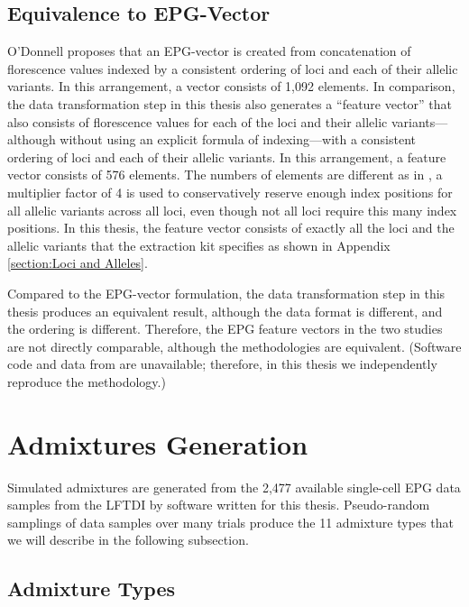 \subsection{Equivalence to EPG-Vector}

O'Donnell \cite{odonnell_clustering_2021} proposes that an EPG-vector is created from concatenation of florescence values indexed by a consistent ordering of loci and each of their allelic variants. In this arrangement, a vector consists of 1,092 elements. In comparison, the data transformation step in this thesis also generates a ``feature vector'' that also consists of florescence values for each of the loci and their allelic variants---although without using an explicit formula of indexing---with a consistent ordering of loci and each of their allelic variants. In this arrangement, a feature vector consists of 576 elements. The numbers of elements are different as in \cite{odonnell_clustering_2021}, a multiplier factor of 4 is used to conservatively reserve enough index positions for all allelic variants across all loci, even though not all loci require this many index positions. In this thesis, the feature vector consists of exactly all the loci and the allelic variants that the extraction kit specifies as shown in Appendix \ref{section:Loci and Alleles}.

Compared to the EPG-vector formulation, the data transformation step in this thesis produces an equivalent result, although the data format is different, and the ordering is different. Therefore, the EPG feature vectors in the two studies are not directly comparable, although the methodologies are equivalent. (Software code and data from \cite{odonnell_clustering_2021} are unavailable; therefore, in this thesis we independently reproduce the methodology.)

\section{Admixtures Generation}

Simulated admixtures are generated from the 2,477 available single-cell EPG data samples from the LFTDI by software written for this thesis. Pseudo-random samplings of data samples over many trials produce the 11 admixture types that we will describe in the following subsection.

\subsection{Admixture Types}

